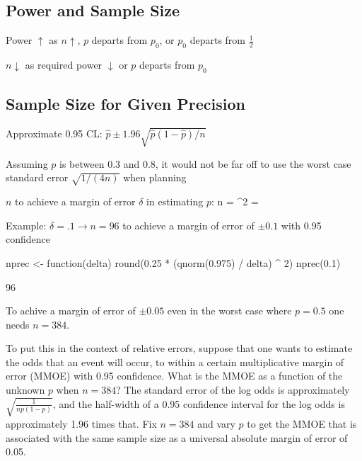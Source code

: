 \subsection{Power and Sample Size}
\bi
\item Power $\uparrow$ as $n \uparrow$, $p$ departs from $p_{0}$, or
  $p_{0}$ departs from $\frac{1}{2}$
\item $n \downarrow$ as required power $\downarrow$ or $p$ departs
  from $p_{0}$
\ei

\subsection{Sample Size for Given Precision}
\bi
\item Approximate 0.95 CL: $\hat{p} \pm 1.96
  \sqrt{\hat{p}(1-\hat{p})/n}$
\item Assuming $p$ is between 0.3 and 0.8, it would not be far off to
  use the worst case standard error $\sqrt{1/(4n)}$ when planning
\item $n$ to achieve a margin of error $\delta$ in estimating $p$: 
\beq
n = ^{2} = 
\eeq
\item Example: $\delta=.1 \rightarrow n=96$ to achieve a margin of error of
  $\pm 0.1$ with 0.95 confidence
\ei
\begin{Schunk}
\begin{Sinput}
nprec <- function(delta) round(0.25 * (qnorm(0.975) / delta) ^ 2)
nprec(0.1)
\end{Sinput}
\begin{Soutput}
[1] 96
\end{Soutput}
\end{Schunk}

To achive a margin of error of $\pm 0.05$ even in the worst case where
$p=0.5$ one needs $n=384$.

To put this in the context of relative errors, suppose that one wants
to estimate the odds that an event will occur, to within a certain
multiplicative margin of error (MMOE) with 0.95 confidence.  What is
the MMOE as a function of the unknown $p$ when $n=384$?  The standard
error of the log odds is approximately $\sqrt{\frac{1}{n p (1 - p)}}$,
and the half-width of a 0.95 confidence interval for the log odds is
approximately 1.96 times that.  Fix $n=384$ and vary $p$ to get the
MMOE that is associated with the same sample size as a universal
absolute margin of error of 0.05.

